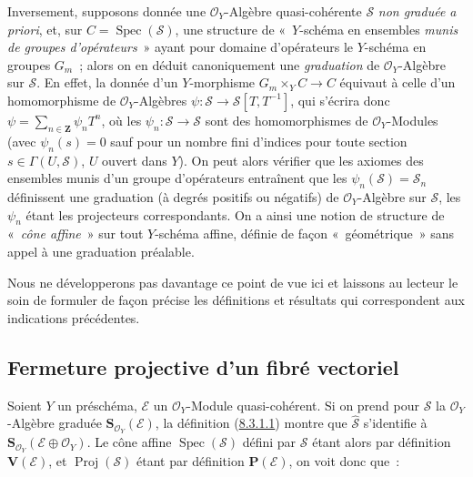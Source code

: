 \begin{remark}[8.3.9]
Inversement, supposons donnée une $\mathcal{O}_Y$-Algèbre quasi-cohérente
$\mathcal{S}$ \emph{non graduée a priori}, et, sur
$C=\operatorname{Spec}(\mathcal{S})$, une structure de «~$Y$-schéma en
ensembles \emph{munis de groupes d'opérateurs}~» ayant pour domaine
d'opérateurs le $Y$-schéma en groupes $G_m$~; alors on en déduit
canoniquement une \emph{graduation} de $\mathcal{O}_Y$-Algèbre sur
$\mathcal{S}$. En effet, la donnée d'un $Y$-morphisme $G_m\times_YC\to C$
équivaut à celle d'un homomorphisme de $\mathcal{O}_Y$-Algèbres
$\psi:\mathcal{S}\to\mathcal{S}[T,T^{-1}]$, qui s'écrira donc
$\psi=\sum_{n\in\mathbf{Z}}\psi_nT^n$, où les
$\psi_n:\mathcal{S}\to\mathcal{S}$ sont des homomorphismes de
$\mathcal{O}_Y$-Modules (avec $\psi_n(s)=0$ sauf pour un nombre fini d'indices
pour toute section $s\in\Gamma(U,\mathcal{S})$, $U$ ouvert dans $Y$). On peut
alors vérifier que les axiomes des ensembles munis d'un groupe d'opérateurs
entraînent que les $\psi_n(\mathcal{S})=\mathcal{S}_n$ définissent une
graduation (à degrés positifs ou négatifs) de $\mathcal{O}_Y$-Algèbre sur
$\mathcal{S}$, les $\psi_n$ étant les projecteurs correspondants. On a ainsi
une notion de structure de «~\emph{cône affine}~» sur tout $Y$-schéma affine,
définie de façon «~géométrique~» sans appel à une graduation préalable.

Nous ne développerons pas davantage ce point de vue ici et laissons au
lecteur le soin de formuler de façon précise les définitions et résultats qui
correspondent aux indications précédentes.
\end{remark}

\subsection{Fermeture projective d'un fibré vectoriel}
\label{subsection:II.8.4-fr}

\begin{env}[8.4.1]
\label{II.8.4.1-fr}
Soient $Y$ un préschéma, $\mathcal{E}$ un $\mathcal{O}_Y$-Module
quasi-cohérent. Si on prend pour $\mathcal{S}$ la $\mathcal{O}_Y$-Algèbre
graduée $\mathbf{S}_{\mathcal{O}_Y}(\mathcal{E})$, la définition
(\hyperref[II.8.3.1.1-fr]{8.3.1.1}) montre que
$\widehat{\mathcal{S}}$ s'identifie à
$\mathbf{S}_{\mathcal{O}_Y}(\mathcal{E}\oplus\mathcal{O}_Y)$. Le cône affine
$\operatorname{Spec}(\mathcal{S})$ défini par $\mathcal{S}$ étant alors par
définition $\mathbf{V}(\mathcal{E})$, et $\operatorname{Proj}(\mathcal{S})$
étant par définition $\mathbf{P}(\mathcal{E})$, on voit donc que~:
\end{env}

